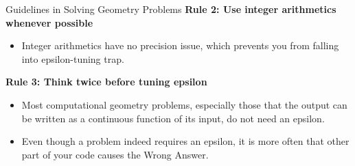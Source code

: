 \documentclass{beamer}
\begin{document}
\begin{frame}[fragile]{Guidelines in Solving Geometry Problems}
	\textbf{Rule 2: Use integer arithmetics whenever possible}
	\pause
	\begin{itemize}
	\item Integer arithmetics have no precision issue, which prevents you from falling into epsilon-tuning trap.
    \end{itemize}
   
    \pause
    
	\textbf{Rule 3: Think twice before tuning epsilon}
	\pause
	\begin{itemize}[<+->]
	\item Most computational geometry problems, especially those that the output can be written as a continuous function of its input, do not need an epsilon.
	\item Even though a problem indeed requires an epsilon, it is more often that other part of your code causes the Wrong Answer.
	\end{itemize}
\end{frame}
\end{document}
